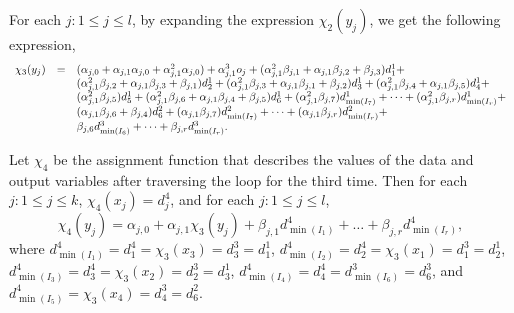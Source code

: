 For each $j: 1 \le j \le l$, 
by expanding the expression $\chi_2(y_j)$, we  get the following expression, 
\[
\begin{array}{l c l}
\chi_3(y_j) & = & 
%
%
(\alpha_{j,0} + \alpha_{j,1} \alpha_{j,0}+ \alpha^2_{j,1} \alpha_{j,0}) + \alpha^3_{j,1} o_j + (\alpha^2_{j,1} \beta_{j,1}+ \alpha_{j,1}\beta_{j,2} + \beta_{j,3} ) d^1_1 + \\
& & (\alpha^2_{j,1} \beta_{j,2}+\alpha_{j,1}\beta_{j,3} + \beta_{j,1} ) d^1_2 + (\alpha^2_{j,1} \beta_{j,3} + \alpha_{j,1}\beta_{j,1} + \beta_{j,2}  ) d^1_3 + (\alpha^2_{j,1} \beta_{j,4}+\alpha_{j,1}\beta_{j,5}) d^1_4 +\\
& & (\alpha^2_{j,1} \beta_{j,5}) d^1_5 + (\alpha^2_{j,1} \beta_{j,6}+\alpha_{j,1}\beta_{j,4}+\beta_{j,5})d^1_6 + (\alpha^2_{j,1} \beta_{j,7}) d^1_{\min(I_7)}+ \dots + (\alpha^2_{j,1} \beta_{j,r}) d^1_{\min(I_r)} + \\
& & (\alpha_{j,1}\beta_{j,6}+\beta_{j,4}) d^2_{6} + (\alpha_{j,1}\beta_{j,7}) d^2_{\min(I_7)} + \dots + (\alpha_{j,1}\beta_{j,r}) d^2_{\min(I_r)}+  \\
& &  \beta_{j,6} d^3_{\min(I_6)} + \dots + \beta_{j,r} d^3_{\min(I_r)}.
\end{array}
\] 

Let $\chi_4$ be the assignment function that describes the values of the data and output variables after traversing the loop for the third time. Then for each $j: 1 \le j \le k$, $\chi_4(x_j)=d^4_j$, and for each $j: 1 \le j \le l$, 
\[\chi_4(y_j) = \alpha_{j,0} + \alpha_{j,1} \chi_3(y_j) + \beta_{j,1} d^4_{\min(I_1)} + \dots + \beta_{j,r} d^4_{\min(I_r)},\]
where $d^4_{\min(I_1)}=d^4_1 = \chi_3(x_3)=d^3_3=d^1_1$, $d^4_{\min(I_2)}=d^4_2 = \chi_3(x_1)=d^3_1=d^1_2$, $d^4_{\min(I_3)}=d^4_3 = \chi_3(x_2)=d^3_2=d^1_3$, $d^4_{\min(I_4)}=d^4_4 = d^3_{\min(I_6)}=d^3_6$, and $d^4_{\min(I_5)}=\chi_3(x_4)=d^3_4=d^2_6$.

